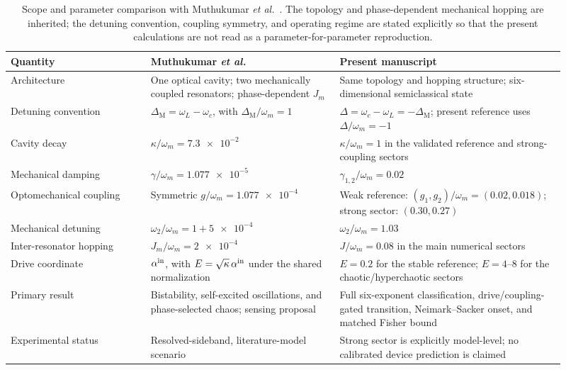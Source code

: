 \documentclass[Phys]{SciPost}
\begin{document}
\begin{table}[h]
  \centering
  \small
  \caption{Scope and parameter comparison with Muthukumar \emph{et al.}~\cite{muthukumar2025doi}.
  The topology and phase-dependent mechanical hopping are inherited; the detuning
  convention, coupling symmetry, and operating regime are stated explicitly so that
  the present calculations are not read as a parameter-for-parameter reproduction.}
  \label{SI-tab:muthukumar-comparison}
  \begin{tabular}{@{}p{0.23\linewidth}p{0.31\linewidth}p{0.37\linewidth}@{}}
    \toprule
    Quantity & Muthukumar \emph{et al.} & Present manuscript \\
    \midrule
    Architecture & One optical cavity; two mechanically coupled resonators; phase-dependent $J_m$ & Same topology and hopping structure; six-dimensional semiclassical state \\
    Detuning convention & $\Delta_{\mathrm M}=\omega_L-\omega_c$, with $\Delta_{\mathrm M}/\omega_m=1$ & $\Delta=\omega_c-\omega_L=-\Delta_{\mathrm M}$; present reference uses $\Delta/\omega_m=-1$ \\
    Cavity decay & $\kappa/\omega_m=\num{7.3e-2}$ & $\kappa/\omega_m=1$ in the validated reference and strong-coupling sectors \\
    Mechanical damping & $\gamma/\omega_m=\num{1.077e-5}$ & $\gamma_{1,2}/\omega_m=\num{0.02}$ \\
    Optomechanical coupling & Symmetric $g/\omega_m=\num{1.077e-4}$ & Weak reference: $(g_1,g_2)/\omega_m=(\num{0.02},\num{0.018})$; strong sector: $(\num{0.30},\num{0.27})$ \\
    Mechanical detuning & $\omega_2/\omega_m=1+\num{5e-4}$ & $\omega_2/\omega_m=\num{1.03}$ \\
    Inter-resonator hopping & $J_m/\omega_m=\num{2e-4}$ & $J/\omega_m=\num{0.08}$ in the main numerical sectors \\
    Drive coordinate & $\alpha^{\rm in}$, with $E=\sqrt{\kappa}\,\alpha^{\rm in}$ under the shared normalization & $E=\num{0.2}$ for the stable reference; $E=\num{4}$--$\num{8}$ for the chaotic/hyperchaotic sectors \\
    Primary result & Bistability, self-excited oscillations, and phase-selected chaos; sensing proposal & Full six-exponent classification, drive/coupling-gated transition, Neimark--Sacker onset, and matched Fisher bound \\
    Experimental status & Resolved-sideband, literature-model scenario & Strong sector is explicitly model-level; no calibrated device prediction is claimed \\
    \bottomrule
  \end{tabular}
\end{table}
\end{document}
